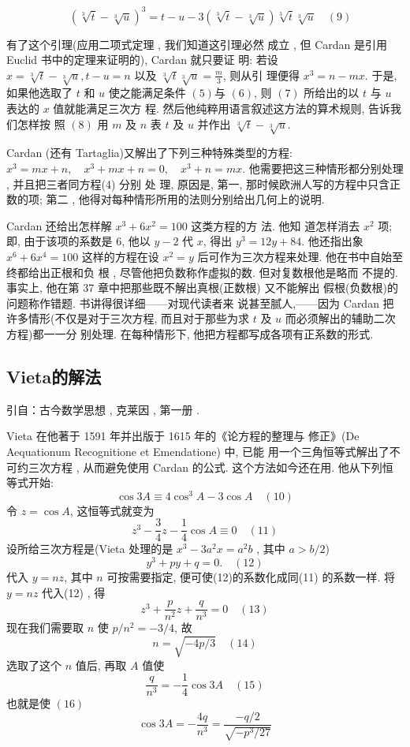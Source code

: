\[\quad(\sqrt[3]{t}-\sqrt[3]{u})^{3}=t-u-3(\sqrt[3]{t}-\sqrt[3]{u}) \sqrt[3]{t} \sqrt[3]{u} \quad (9)\]

有了这个引理(应用二项式定理 , 我们知道这引理必然 成立 , 但
Cardan 是引用 Euclid 书中的定理来证明的), Cardan 就只要证 
明: 若设 $x=\sqrt[3]{t}-\sqrt[3]{u}, t-u=n$ 以及 $\sqrt[3]{t} \sqrt[3]{u}=\frac{m}{3}$, 则从引
理便得 $x^{3}=n-m x .$ 于是, 如果他选取了 $t$ 和 $u$ 使之能满足条件
$(5)$与 $(6)$, 则 $(7)$ 所给出的以 $t$ 与 $u$ 表达的 $x$ 值就能满足三次方
程. 然后他纯粹用语言叙述这方法的算术规则, 告诉我们怎样按
照 $(8)$ 用 $m$ 及 $n$ 表 $t$ 及 $u$ 并作出 $\sqrt[3]{t}-\sqrt[3]{u} .$

Cardan (还有 Tartaglia)又解出了下列三种特殊类型的方程:
$x^{3}=m x+n, \quad x^{3}+m x+n=0, \quad x^{3}+n=m x .$
他需要把这三种情形都分别处理 , 并且把三者同方程(4) 分别 处
理, 原因是, 第一, 那时候欧洲人写的方程中只含正数的项; 第二 , 
他得对每种情形所用的法则分别给出几何上的说明.

Cardan 还给出怎样解 $x^{3}+6 x^{2}=100$ 这类方程的方 法. 他知
道怎样消去 $x^{2}$ 项; 即, 由于该项的系数是 6, 他以 $y-2$ 代 $x$, 得出
$y^{3}=12 y+84 .$ 他还指出象 $x^{6}+6 x^{4}=100$ 这样的方程在设 $x^{2}=y$
后可作为三次方程来处理. 他在书中自始至终都给出正根和负
根 , 尽管他把负数称作虚拟的数. 但对复数根他是略而 不提的.
事实上, 他在第 37 章中把那些既不解出真根(正数根) 又不能解出
假根(负数根)的问题称作错题. 书讲得很详细——对现代读者来
说甚至腻人,——因为 Cardan 把许多情形(不仅是对于三次方程,
而且对于那些为求 $t$ 及 $u$ 而必须解出的辅助二次方程)都一一分
别处理. 在每种情形下, 他把方程都写成各项有正系数的形式.


\subsection{Vieta的解法}
引自：古今数学思想 , 克莱因 , 第一册 . 

Vieta 在他著于 1591 年并出版于 1615 年的《论方程的整理与
修正》(De Aequationum Recognitione et Emendatione) 中, 已能
用一个三角恒等式解出了不可约三次方程 , 从而避免使用 Cardan 的公式. 这个方法如今还在用. 他从下列恒等式开始:
\[
\cos 3 A \equiv 4 \cos ^{3} A-3 \cos A \quad (10)
\]
令 $z=\cos A$, 这恒等式就变为
\[
z^{3}-\frac{3}{4} z-\frac{1}{4} \cos A \equiv 0 \quad (11)
\]
设所给三次方程是(Vieta 处理的是 $x^{3}-3 a^{2} x=a^{2} b$  , 其中 $a>b / 2$)
\[
y^{3}+p y+q=0 .  \quad (12)
\]
代入 $y=n z$, 其中 $n$ 可按需要指定, 便可使(12)的系数化成同(11) 
的系数一样. 将 $y=n z$ 代入(12) , 得
\[
z^{3}+\frac{p}{n^{2}} z+\frac{q}{n^{3}}=0 \quad (13)
\]
现在我们需要取 $n$ 使 $p / n^{2}=-3 / 4$, 故
\[
n=\sqrt{-4 p / 3} \quad (14)
\]
选取了这个 $n$ 值后, 再取 $A$ 值使
\[
\frac{q}{n^{3}}=-\frac{1}{4} \cos 3 A \quad (15)
\]
也就是使
$(16)$
\[
\cos 3 A=-\frac{4 q}{n^{3}}=\frac{-q / 2}{\sqrt{-p^{3} / 27}}
\]


